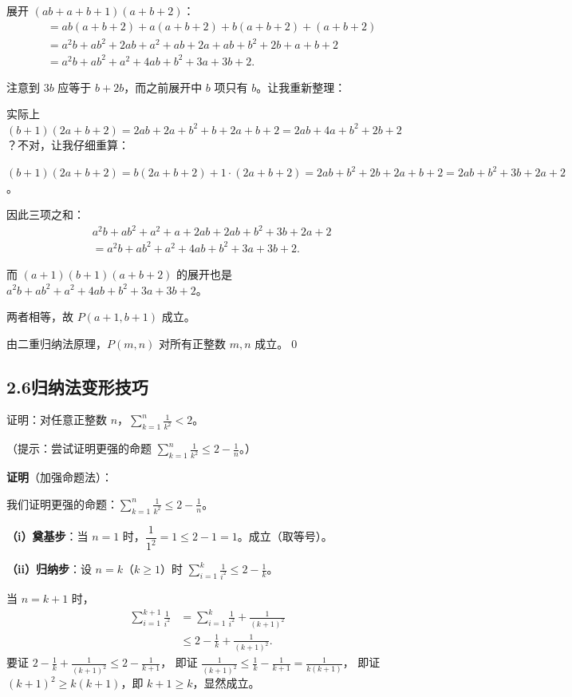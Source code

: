 \documentclass[12pt, a4paper]{ctexart}
\begin{document}
展开 $(ab+a+b+1)(a+b+2)$：
\begin{align*}
&= ab(a+b+2) + a(a+b+2) + b(a+b+2) + (a+b+2) \\
&= a^2b + ab^2 + 2ab + a^2 + ab + 2a + ab + b^2 + 2b + a + b + 2 \\
&= a^2b + ab^2 + a^2 + 4ab + b^2 + 3a + 3b + 2.
\end{align*}

注意到 $3b$ 应等于 $b + 2b$，而之前展开中 $b$ 项只有 $b$。让我重新整理：

实际上 $(b+1)(2a+b+2) = 2ab + 2a + b^2 + b + 2a + b + 2 = 2ab + 4a + b^2 + 2b + 2$？不对，让我仔细重算：

$(b+1)(2a+b+2) = b(2a+b+2) + 1 \cdot (2a+b+2) = 2ab + b^2 + 2b + 2a + b + 2 = 2ab + b^2 + 3b + 2a + 2$。

因此三项之和：
\begin{align*}
&a^2b + ab^2 + a^2 + a + 2ab + 2ab + b^2 + 3b + 2a + 2 \\
&= a^2b + ab^2 + a^2 + 4ab + b^2 + 3a + 3b + 2.
\end{align*}

而 $(a+1)(b+1)(a+b+2)$ 的展开也是 $a^2b + ab^2 + a^2 + 4ab + b^2 + 3a + 3b + 2$。

两者相等，故 $P(a+1, b+1)$ 成立。

由二重归纳法原理，$P(m, n)$ 对所有正整数 $m, n$ 成立。\qed

\subsection*{2.6\quad 归纳法变形技巧}

\begin{examplebox}[【例题10】加强命题]
证明：对任意正整数 $n$，$\displaystyle\sum_{k=1}^{n}\frac{1}{k^2} < 2$。

（提示：尝试证明更强的命题 $\displaystyle\sum_{k=1}^{n}\frac{1}{k^2} \leq 2 - \frac{1}{n}$。）
\end{examplebox}

\textbf{证明}（加强命题法）：

我们证明更强的命题：$\displaystyle\sum_{k=1}^{n}\frac{1}{k^2} \leq 2 - \frac{1}{n}$。

\textbf{（i）奠基步}：当 $n=1$ 时，$\dfrac{1}{1^2} = 1 \leq 2 - 1 = 1$。成立（取等号）。

\textbf{（ii）归纳步}：设 $n = k$（$k \geq 1$）时 $\displaystyle\sum_{i=1}^{k}\frac{1}{i^2} \leq 2 - \frac{1}{k}$。

当 $n = k+1$ 时，
\begin{align*}
\sum_{i=1}^{k+1}\frac{1}{i^2} &= \sum_{i=1}^{k}\frac{1}{i^2} + \frac{1}{(k+1)^2} \\
&\leq 2 - \frac{1}{k} + \frac{1}{(k+1)^2}.
\end{align*}
要证 $\displaystyle 2 - \frac{1}{k} + \frac{1}{(k+1)^2} \leq 2 - \frac{1}{k+1}$，
即证 $\displaystyle\frac{1}{(k+1)^2} \leq \frac{1}{k} - \frac{1}{k+1} = \frac{1}{k(k+1)}$，
即证 $(k+1)^2 \geq k(k+1)$，即 $k+1 \geq k$，显然成立。
\end{document}
